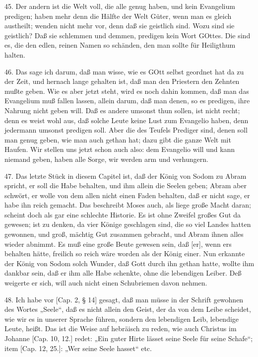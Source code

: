 45. Der andern ist die Welt voll, die alle genug haben, und kein Evangelium predigen; haben mehr denn die Hälfte der Welt Güter, wenn man es gleich austheilt; wenden nicht mehr vor, denn daß sie geistlich sind. Wozu sind sie geistlich? Daß sie schlemmen und demmen, predigen kein Wort GOttes. Die sind es, die den edlen, reinen Namen so schänden, den man sollte für Heiligthum halten.

46. Das sage ich darum, daß man wisse, wie es GOtt selbst geordnet hat da zu der Zeit, und hernach lange gehalten ist, daß man den Priestern den Zehnten mußte geben. Wie es aber jetzt steht, wird es noch dahin kommen, daß man das Evangelium muß fallen lassen, allein darum, daß man denen, so es predigen, ihre Nahrung nicht geben will. Daß es andere umsonst thun sollen, ist nicht recht; denn es weist wohl aus, daß solche Leute keine Lust zum Evangelio haben, denn jedermann umsonst predigen soll. Aber die des Teufels Prediger sind, denen soll man genug geben, wie man auch gethan hat; dazu gibt die ganze Welt mit Haufen. Wir stellen uns jetzt schon auch also: dem Evangelio will und kann niemand geben, haben alle Sorge, wir werden arm und verhungern.

47. Das letzte Stück in diesem Capitel ist, daß der König von Sodom zu Abram spricht, er soll die Habe behalten, und ihm allein die Seelen geben; Abram aber schwört, er wolle von dem allen nicht einen Faden behalten, daß er nicht sage, er habe ihn reich gemacht. Das beschreibt Moses auch, als liege große Macht daran; scheint doch als gar eine schlechte Historie. Es ist ohne Zweifel großes Gut da gewesen; ist zu denken, da vier Könige geschlagen sind, die so viel Landes hatten gewonnen, und groß, mächtig Gut zusammen gebracht, und Abram ihnen alles wieder abnimmt. Es muß eine große Beute gewesen sein, daß [er], wenn ers behalten hätte, freilich so reich wäre worden als der König einer. Nun erkannte der König von Sodom solch Wunder, daß Gott durch ihn gethan hatte, wollte ihm dankbar sein, daß er ihm alle Habe schenkte, ohne die lebendigen Leiber. Deß weigerte er sich, will auch nicht einen Schubriemen davon nehmen.

48. Ich habe vor [Cap. 2, § 14] gesagt, daß man müsse in der Schrift gewohnen des Wortes „Seele“, daß es nicht allein den Geist, der da von dem Leibe scheidet, wie wir es in unserer Sprache führen, sondern den lebendigen Leib, lebendige Leute, heißt. Das ist die Weise auf hebräisch zu reden, wie auch Christus im Johanne [Cap. 10, 12.] redet: „Ein guter Hirte lässet seine Seele für seine Schafe“; item [Cap. 12, 25.]: „Wer seine Seele hasset“ etc.

